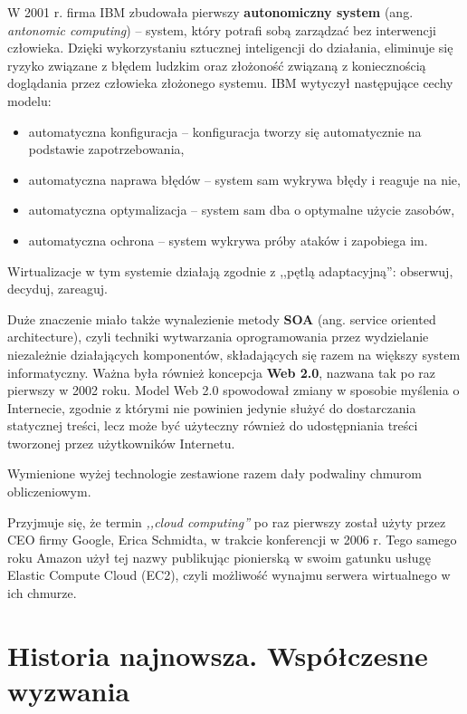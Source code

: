 \documentclass[12pt,a4paper,twoside,titlepage,openright]{book}
\begin{document}
W 2001 r. firma IBM zbudowała pierwszy \textbf{autonomiczny system} (ang. \textit{antonomic computing}) -- system, który potrafi sobą zarządzać bez interwencji człowieka. Dzięki wykorzystaniu sztucznej inteligencji do działania, eliminuje się ryzyko związane z błędem ludzkim oraz złożoność związaną z koniecznością doglądania przez człowieka złożonego systemu. IBM wytyczył następujące cechy modelu:
\begin{itemize}
\item automatyczna konfiguracja -- konfiguracja tworzy się automatycznie na podstawie zapotrzebowania,
\item automatyczna naprawa błędów -- system sam wykrywa błędy i reaguje na nie,
\item automatyczna optymalizacja -- system sam dba o optymalne użycie zasobów,
\item automatyczna ochrona -- system wykrywa próby ataków i zapobiega im.
\end{itemize}
Wirtualizacje w tym systemie działają zgodnie z ,,pętlą adaptacyjną'': obserwuj, decyduj, zareaguj.\cite{ccSpringer}


Duże znaczenie miało także wynalezienie metody \textbf{SOA} (ang. service oriented architecture), czyli techniki wytwarzania oprogramowania przez wydzielanie niezależnie działających komponentów, składających się razem na większy system informatyczny. Ważna była również koncepcja \textbf{Web 2.0}, nazwana tak po raz pierwszy w 2002 roku. Model Web 2.0 spowodował zmiany w sposobie myślenia o Internecie, zgodnie z którymi nie powinien jedynie służyć do dostarczania statycznej treści, lecz może być użyteczny również do udostępniania treści tworzonej przez użytkowników Internetu.

Wymienione wyżej technologie zestawione razem dały podwaliny chmurom obliczeniowym.

Przyjmuje się, że termin \textit{,,cloud computing''} po raz pierwszy został użyty przez CEO firmy Google, Erica Schmidta, w trakcie konferencji w 2006 r. Tego samego roku Amazon użył tej nazwy publikując pionierską w swoim gatunku usługę Elastic Compute Cloud (EC2), czyli możliwość wynajmu serwera wirtualnego w ich chmurze.

\section{Historia najnowsza. Współczesne wyzwania}
\end{document}
